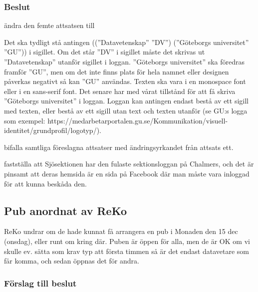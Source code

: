 \documentclass[protokoll]{dvd}
\begin{document}
           \subsubsection*{Beslut}
           \begin{attsatser}
               \item ändra den femte attsatsen till 
                   \begin{displayquote}
                        Det ska tydligt stå antingen ((''Datavetenskap'' \lor ''DV'') \land (''Göteborgs universitet'' \lor ''GU'')) i sigillet.
                        Om det står ''DV'' i sigillet måste det skrivas ut ''Datavetenskap'' utanför sigillet i loggan.
                        ''Göteborgs universitet'' ska föredras framför ''GU'', men om det inte finns plats för hela namnet eller designen påverkas negativt så kan ''GU'' användas.
                        Texten ska vara i en monospace font eller i en sans-serif font.
                        Det senare har med vårat tillstånd för att få skriva ''Göteborgs universitet'' i loggan.
                        Loggan kan antingen endast bestå av ett sigill med texten, eller bestå av ett sigill utan text och texten utanför (se GU:s logga som exempel: https://medarbetarportalen.gu.se/Kommunikation/visuell-identitet/grundprofil/logotyp/).
                   \end{displayquote}
                \item bifalla samtliga föreslagna attsatser med ändringsyrkandet från attsats ett.
                \item fastställa att Sjösektionen har den fulaste sektionsloggan på Chalmers, och det är pinsamt att deras hemsida är en sida på Facebook där man måste vara inloggad för att kunna beskåda den.

           \end{attsatser}

           \subsection{Pub anordnat av ReKo}
            ReKo undrar om de hade kunnat få arrangera en pub i Monaden den 15 dec (onsdag), eller runt om kring där. Puben är öppen för alla, men de är OK om vi skulle ev. sätta som krav typ att första timmen så är det endast datavetare som får komma, och sedan öppnas det för andra.
            \subsubsection*{Förslag till beslut}
\end{document}
